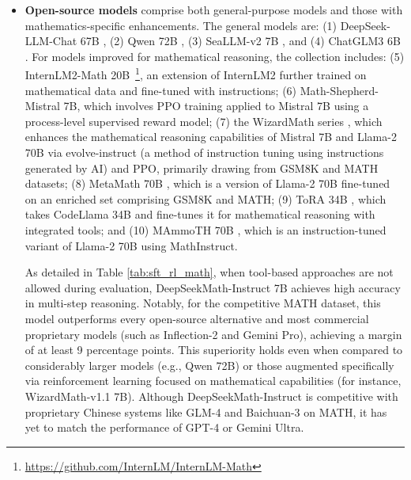 \begin{itemize}[topsep=0pt]
\begin{itemize}[topsep=0pt]
    \item \textbf{Closed-source models} evaluated include: (1) the GPT series, with GPT-4 \citep{gpt4} and GPT-4 Code Interpreter~\footnote{\url{https://openai.com/blog/chatgpt-plugins\#\#code-interpreter}} representing the top-tier systems, (2) Gemini Ultra and Gemini Pro \citep{gemini}, (3) Inflection-2 \citep{inflection-2}, (4) Grok-1~\footnote{\url{https://x.ai/model-card}}, as well as (5) Baichuan-3~\footnote{\url{https://www.baichuan-ai.com}}, and (6) the newest GLM-4~\footnote{\url{https://open.bigmodel.cn/dev/api\#glm-4}}

    belonging to the GLM family \citep{glm}.
\end{itemize}

These models are generally designed for broad application and typically have been subjected to various alignment techniques.

\item \textbf{Open-source models} comprise both general-purpose models and those with mathematics-specific enhancements. The general models are: (1) DeepSeek-LLM-Chat 67B \citep{deepseek-llm}, (2) Qwen 72B \citep{qwen}, (3) SeaLLM-v2 7B \citep{seallm}, and (4) ChatGLM3 6B \citep{chatglm3}. For models improved for mathematical reasoning, the collection includes: (5) InternLM2-Math 20B~\footnote{\url{https://github.com/InternLM/InternLM-Math}}, an extension of InternLM2 further trained on mathematical data and fine-tuned with instructions; (6) Math-Shepherd-Mistral 7B, which involves PPO training \citep{schulman2017proximal} applied to Mistral 7B \citep{mistral} using a process-level supervised reward model; (7) the WizardMath series \citep{wizardmath}, which enhances the mathematical reasoning capabilities of Mistral 7B and Llama-2 70B \citep{llama2} via evolve-instruct (a method of instruction tuning using instructions generated by AI) and PPO, primarily drawing from GSM8K and MATH datasets; (8) MetaMath 70B \citep{metamath}, which is a version of Llama-2 70B fine-tuned on an enriched set comprising GSM8K and MATH; (9) ToRA 34B \cite{tora}, which takes CodeLlama 34B and fine-tunes it for mathematical reasoning with integrated tools; and (10) MAmmoTH 70B \citep{MathInstruct}, which is an instruction-tuned variant of Llama-2 70B using MathInstruct.

As detailed in Table \ref{tab:sft_rl_math}, when tool-based approaches are not allowed during evaluation, DeepSeekMath-Instruct 7B achieves high accuracy in multi-step reasoning. Notably, for the competitive MATH dataset, this model outperforms every open-source alternative and most commercial proprietary models (such as Inflection-2 and Gemini Pro), achieving a margin of at least 9 percentage points. This superiority holds even when compared to considerably larger models (e.g., Qwen 72B) or those augmented specifically via reinforcement learning focused on mathematical capabilities (for instance, WizardMath-v1.1 7B). Although DeepSeekMath-Instruct is competitive with proprietary Chinese systems like GLM-4 and Baichuan-3 on MATH, it has yet to match the performance of GPT-4 or Gemini Ultra.


\end{itemize}
